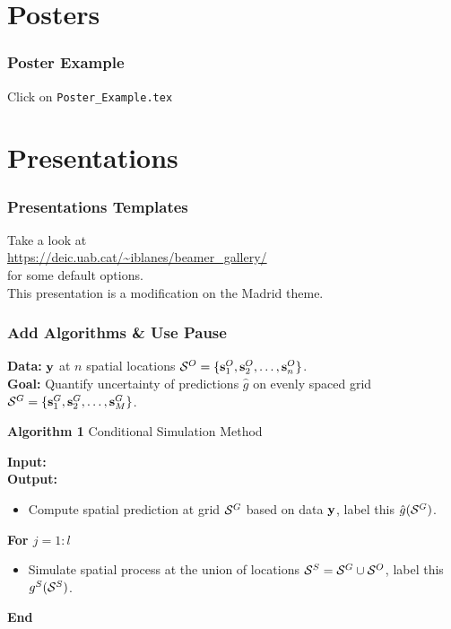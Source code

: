 \documentclass[serif,12pt, aspectratio=169]{beamer}
\begin{document}

\section{Posters}
\begin{frame}
	\frametitle{Poster Example}
	\centering
	{\Large Click on \texttt{Poster\_Example.tex}}
\end{frame}



\section{Presentations}
\begin{frame}
	\frametitle{Presentations Templates}
	Take a look at  \\ \url{https://deic.uab.cat/~iblanes/beamer_gallery/} \\
	for some default options. 
	\pause
	\\
	This presentation is a modification on the Madrid theme. 
\end{frame}

\begin{frame}
	\frametitle{Add Algorithms \& Use Pause}
\textbf{Data:} $\mathbf{y}$ at $n$ spatial locations $\mathcal{S}^O = \{\mathbf{s}^O_1, \mathbf{s}^O_2, \dots, \mathbf{s}^O_n\}$.   \\
	\textbf{Goal:} Quantify uncertainty of predictions $\hat{g}$ on evenly spaced grid $\mathcal{S}^G = \{\mathbf{s}^G_1, \mathbf{s}_2^G, \dots, \mathbf{s}_M^G\}$. \pause
	\begin{algorithm}[H] 
	\caption*{\textbf{Algorithm 1} Conditional Simulation Method}
	{ \small \textbf{Input: }  }\\
	{ \small \textbf{Output: }  } \pause
		\begin{itemize}
		\item { \small Compute spatial prediction at grid $\mathcal{S}^G$ based on data $\mathbf{y}$, label this $\hat{g}(\mathcal{S}^G)$.} \pause
		\end{itemize}
		{ \small \noindent \textbf{For $j = 1:l$}}
		\begin{itemize}
		\item { \small Simulate spatial process at the union of locations $\mathcal{S}^S = \mathcal{S}^G \cup \mathcal{S}^O$, label this $g^S(\mathcal{S}^S)$.}
		\end{itemize}
		{ \small \noindent \textbf{End}}
		\vspace{1pt}
	\end{algorithm}
\end{frame}
\end{document}
